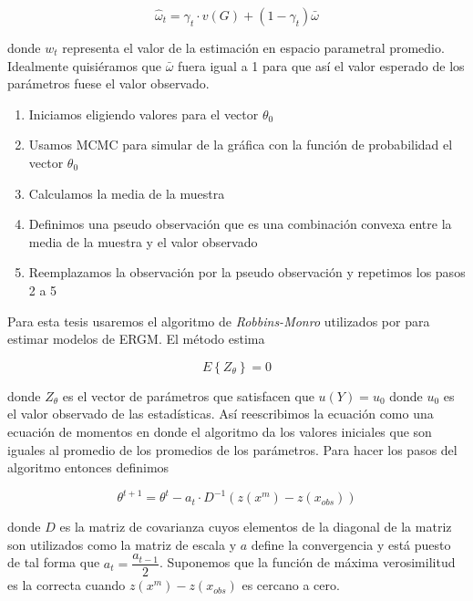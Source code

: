 \begin{equation*}
    \hat{\omega}_{t}=\gamma_{t} \cdot v(G)+\left(1-\gamma_{t}\right) \bar{\omega}
\end{equation*}

donde $w_t$ representa el valor de la estimación en espacio parametral promedio. Idealmente quisiéramos que $\bar{\omega}$ fuera igual a 1 para que así el valor esperado de los parámetros fuese el valor observado.

\begin{enumerate}
    \item Iniciamos eligiendo valores para el vector $\theta_0$
    \item Usamos MCMC para simular de la gráfica con la función de probabilidad el vector $\theta_0$
    \item Calculamos la media de la muestra
    \item Definimos una pseudo observación que es una combinación convexa  entre la media de la muestra y el valor observado
    \item Reemplazamos la observación por la pseudo observación y repetimos los pasos 2 a 5
\end{enumerate}

Para esta tesis usaremos el algoritmo de \textit{Robbins-Monro} utilizados por  \cite{Snidjers2002} para estimar modelos de ERGM. El método estima

\begin{equation*}
    E\left\{Z_{\theta}\right\}=0
\end{equation*}

donde $Z_{\theta}$ es el vector de parámetros que satisfacen que $u(Y) = u_0$ donde $u_0$ es el valor observado de las estadísticas. Así reescribimos la ecuación como una ecuación de momentos en donde el algoritmo da los valores iniciales que son iguales al promedio de los promedios de los parámetros. Para hacer los pasos del algoritmo entonces definimos 

\begin{equation*}
    \theta^{t+1}=\theta^{t}-a_{t} \cdot D^{-1}\left(z\left(x^{m}\right)-z\left(x_{o b s}\right)\right)
\end{equation*}

donde $D$ es la matriz de covarianza cuyos elementos de la diagonal de la matriz son utilizados como la matriz de escala y $a$ define la convergencia y está puesto de tal forma que $a_t = \dfrac{a_{t-1}}{2}$. Suponemos que la función de máxima verosimilitud es la correcta cuando $z(x^m) - z(x_{obs})$ es cercano a cero.

